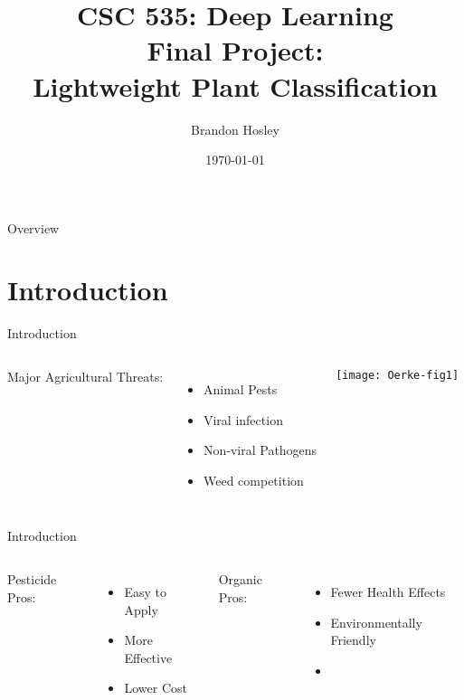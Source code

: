 \documentclass{beamer}
\title{CSC 535: Deep Learning \\ Final Project: \\ Lightweight Plant Classification}
\author{Brandon Hosley}
\institute{University of Illinois - Springfield}
\date{\today}
\begin{document}
\frame{\titlepage}

\begin{frame}{Overview}
\tableofcontents
\end{frame}

\section[Intro]{Introduction}

\begin{frame}{Introduction}
	\begin{columns}
		Major Agricultural Threats:
		\begin{itemize}
			\item Animal Pests
			\item Viral infection
			\item Non-viral Pathogens
			\item Weed competition
		\end{itemize}

		\texttt{[image: Oerke-fig1]}
	\end{columns}
\end{frame}

\begin{frame}{Introduction}
	\begin{columns}
		\column{0.5\textwidth}
		Pesticide Pros:
		\begin{itemize}
			\item Easy to Apply
			\item More Effective
			\item Lower Cost
		\end{itemize}
		\column{0.5\textwidth}
		Organic Pros:
		\begin{itemize}
			\item Fewer Health Effects
			\item Environmentally Friendly
			\item[]
		\end{itemize}
	\end{columns}
\end{frame}
\end{document}
